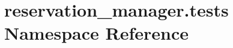 \hypertarget{namespacereservation__manager_1_1tests}{\section{reservation\-\_\-manager.\-tests Namespace Reference}
\label{namespacereservation__manager_1_1tests}
}
